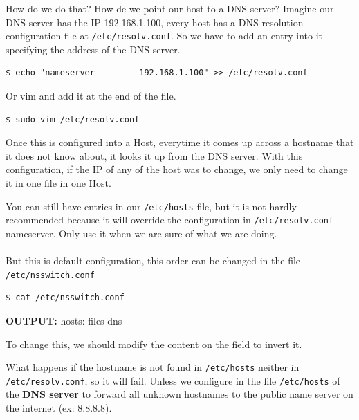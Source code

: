\documentclass{article}
\newenvironment{blocktemplateIII}[1]{%
    \tcolorbox[beamer,%
    noparskip,breakable,
    ,colframe=Red,%
    colbacklower=LimeGreen!75!LightGreen,%
    title=#1]}%
    {\endtcolorbox}
\newenvironment{codetemplate}[1][]{%
  \mybasecolorbox[#1]
  \itshape
}{%
  \endmybasecolorbox
}
\begin{document}
How do we do that? How de we point our host to a DNS server? Imagine our DNS server has the IP 192.168.1.100, every host has a DNS resolution configuration file at \verb|/etc/resolv.conf|. So we have to add an entry into it specifying the address of the DNS server.

\begin{codetemplate}{}
\begin{verbatim}
$ echo "nameserver         192.168.1.100" >> /etc/resolv.conf
\end{verbatim}
\end{codetemplate}

Or vim and add it at the end of the file.
\begin{codetemplate}{}
\begin{verbatim}
$ sudo vim /etc/resolv.conf
\end{verbatim}
\end{codetemplate}

Once this is configured into a Host, everytime it comes up across a hostname that it does not know about, it looks it up from the DNS server. With this configuration, if the IP of any of the host was to change, we only need to change it in one file in one Host.

\begin{blocktemplateIII}{WARNING}
You can still have entries in our \verb|/etc/hosts| file, but it is not hardly recommended because it will override the configuration in \verb|/etc/resolv.conf| nameserver. Only use it when we are sure of what we are doing.
\\\\
But this is default configuration, this order can be changed in the file \verb|/etc/nsswitch.conf|
\begin{codetemplate}{}
\begin{verbatim}
$ cat /etc/nsswitch.conf
\end{verbatim}
\end{codetemplate}

\textbf{OUTPUT:} hosts:    files dns

To change this, we should modify the content on the field to invert it.
\end{blocktemplateIII}

What happens if the hostname is not found in \verb|/etc/hosts| neither in \verb|/etc/resolv.conf|, so it will fail. Unless we configure in the file \verb|/etc/hosts| of the \textbf{DNS server} to forward all unknown hostnames to the public name server on the internet (ex: 8.8.8.8).
\end{document}
